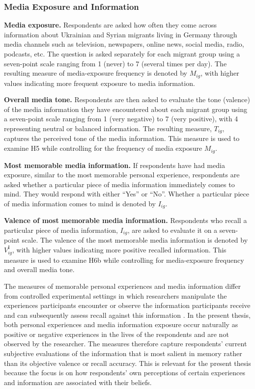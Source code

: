 \subsubsection{Media Exposure and Information}

\noindent\textbf{Media exposure.} Respondents are asked how often they come across information about Ukrainian and 
Syrian migrants living in Germany through media channels such as television, newspapers, online news, social media, 
radio, podcasts, etc. The question is asked separately for each migrant group using a seven-point scale ranging from 
1 (never) to 7 (several times per day). The resulting measure of media-exposure frequency is denoted by \(M_{ig}\), 
with higher values indicating more frequent exposure to media information.\bigskip

\noindent\textbf{Overall media tone.} Respondents are then asked to evaluate the tone (valence) of the media information they 
have encountered about each migrant group using a seven-point scale ranging from 1 (very negative) to 7 (very positive), 
with 4 representing neutral or balanced information. The resulting measure, \(T_{ig}\), captures the perceived tone 
of the media information. This measure is used to examine H5 while controlling for the frequency of media exposure 
\(M_{ig}\).\bigskip

\noindent\textbf{Most memorable media information.} If respondents have had media exposure, similar to the most memorable 
personal experience, respondents are asked whether a particular piece of media information immediately comes to mind. 
They would respond with either ``Yes'' or ``No''. Whether a particular piece of media information comes to mind is 
denoted by \(I_{ig}\).\bigskip 

\noindent\textbf{Valence of most memorable media information.} 
Respondents who recall a particular piece of media information, \(I_{ig}\), are asked to evaluate it on a seven-point 
scale. The valence of the most memorable media information is denoted by \(V^{\mathrm{I}}_{ig}\), with higher values 
indicating more positive recalled information. This measure is used to examine H6b while controlling for media-exposure 
frequency and overall media tone.

The measures of memorable personal experiences and media information differ from controlled experimental settings in 
which researchers manipulate the experiences participants encounter \citep{schwerter2020determinants} or observe the 
information participants receive and can subsequently assess recall against this information \citep{graeber2024stories}. 
In the present thesis, both personal experiences and media information exposure occur naturally as positive or negative experiences 
in the lives of the respondents and are not observed by the researcher. The measures therefore capture respondents' 
current subjective evaluations of the information that is most salient in memory rather than its objective valence or recall accuracy.
This is relevant for the present thesis because the focus is on how respondents' own perceptions of certain experiences 
and information are associated with their beliefs.

